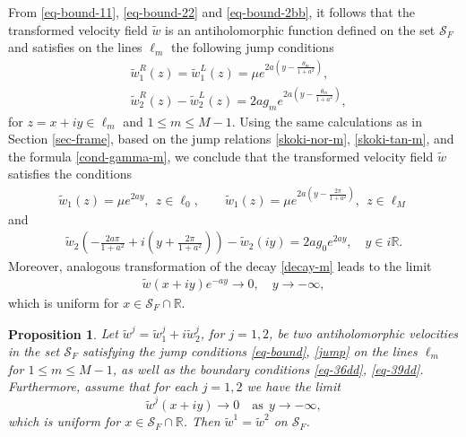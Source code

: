 \documentclass[11pt, letterpaper, reqno]{amsart}
\numberwithin{equation}{section}
\theoremstyle{definition}
\theoremstyle{plain}
\newtheorem{prop}[defi]{Proposition}
\numberwithin{equation}{section}
\def\R{\mathbb{R}}
\def\SS{\mathcal{S}}
\begin{document}
From \eqref{eq-bound-11}, \eqref{eq-bound-22} and \eqref{eq-bound-2bb}, it follows that the transformed velocity field $\tilde w$ is an antiholomorphic function defined on the set $\SS_{F}$ and satisfies on the lines $\ell_{m}$ the following jump conditions 
\begin{align}\label{eq-bound}
& \tilde{w}_{1}^{R}(z) = \tilde{w}_{1}^{L}(z) = \mu e^{2a(y-\frac{\theta_{m}}{1+a^{2}})}, \\ \label{jump}
& \tilde{w}_{2}^{R}(z) - \tilde{w}_{2}^{L}(z) = 2ag_{m} e^{2a(y - \frac{\theta_{m}}{1+a^{2}})}, 
\end{align}
for $z=x+iy\in\ell_{m}$ and $1\le m \le M-1$. Using the same calculations as in Section \ref{sec-frame}, based on the jump relations \eqref{skoki-nor-m}, \eqref{skoki-tan-m}, and the formula \eqref{cond-gamma-m}, we conclude that the transformed velocity field $\tilde w$ satisfies the conditions 
\begin{align}\label{eq-36dd}
\tilde{w}_{1}(z) = \mu e^{2ay}, \ \ z\in\ell_{0}, \qquad 
\tilde{w}_{1}(z) = \mu e^{2a(y - \frac{2\pi}{1+a^2})}, \ \ z\in\ell_{M}
\end{align}
and
\begin{align}\label{eq-39dd}
\tilde{w}_{2}\left(-\frac{2a\pi}{1+a^2} + i\left(y + \frac{2\pi}{1+a^2}\right)\right) - \tilde{w}_{2}(iy) = 2ag_{0} e^{2ay}, \quad y\in i\R.
\end{align}
Moreover, analogous transformation of the decay \eqref{decay-m} leads to the limit 
\begin{align}\label{v-decay-2}
\tilde{w}(x+iy)e^{-ay} \to 0, \quad y\to-\infty,
\end{align}
which is uniform for $x\in\SS_{F}\cap \R$.
\begin{prop}
Let $\tilde{w}^j = \tilde{w}^{j}_{1}+i\tilde{w}^{j}_{2}$, for $j = 1, 2$, be two antiholomorphic velocities in the set $\SS_{F}$ satisfying the jump conditions \eqref{eq-bound}, \eqref{jump} on the lines $\ell_{m}$ for $1\le m \le M-1$, as well as the boundary conditions \eqref{eq-36dd}, \eqref{eq-39dd}. Furthermore, assume that for each $j=1,2$ we have the limit
\begin{equation*}
\tilde{w}^j(x+iy)\rightarrow 0\quad \text{as} \ \ y\to -\infty,
\end{equation*}
which is uniform for $x\in\SS_{F}\cap \R$. Then $\tilde{w}^1 = \tilde{w}^2$ on $\SS_{F}$.
\end{prop}
\end{document}
